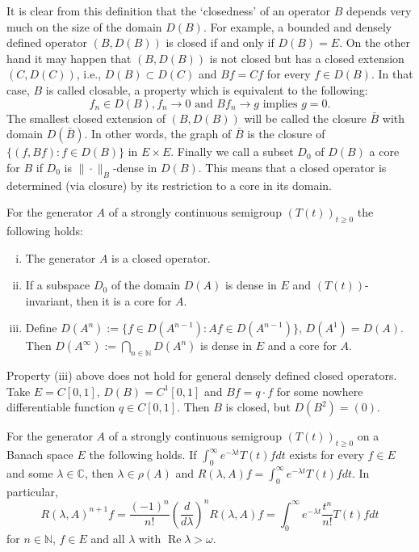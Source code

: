 It is clear from this definition that the \enquote*{closedness} of an operator $B$ depends very much on the size of the domain $D(B)$.
For example, a bounded and densely defined operator $(B,D(B))$ is closed if and only if $D(B) = E$.
On the other hand it may happen that $(B,D(B))$ is not closed but has a closed extension $(C,D(C))$, i.e., $D(B) \subset D(C)$ and $Bf = Cf$ for every $f \in D(B)$.
In that case, $B$ is called closable, a property which is equivalent to the following:
\begin{equation}
f_{n} \in D(B), f_{n} \to 0 \text{ and } Bf_{n} \to g \text{ implies } g = 0.
\end{equation}
The smallest closed extension of $(B,D(B))$ will be called the closure $\bar{B}$ with domain $D(\bar{B})$.
In other words, the graph of $\bar{B}$ is the closure of $\{(f,Bf) \colon f \in D(B)\}$ in $E \times E$.
Finally we call a subset $D_0$ of $D(B)$ a core for $B$ if $D_0$ is $\|\cdot\|_{B}$-dense in $D(B)$.
This means that a closed operator is determined (via closure) by its restriction to a core in its domain.
\begin{proposition}
For the generator $A$ of a strongly continuous semigroup $(T(t))_{t \geq 0}$ the following holds:

\begin{enumerate}[(i)]
\item
The generator $A$ is a closed operator.

\item
If a subspace $D_0$ of the domain $D(A)$ is dense in $E$ and $(T(t))$-invariant, then it is a core for $A$.
\item
Define $D(A^{n}) := \{f \in D(A^{n-1}) \colon Af \in D(A^{n-1})\}$, $D(A^{1}) = D(A)$.
Then $D(A^\infty) := \bigcap_{n \in \mathbb{N}} D(A^{n})$ is dense in $E$ and a core for $A$.

\end{enumerate}
\end{proposition}
\begin{example}
Property (iii) above does not hold for general densely defined closed operators.
Take $E = C[0,1]$, $D(B) = C^{1}[0,1]$ and $Bf = q \cdot f$ for some nowhere differentiable function $q \in C[0,1]$.
Then $B$ is closed, but $D(B^{2}) = (0)$.
\end{example}
\begin{proposition}
For the generator $A$ of a strongly continuous semigroup $(T(t))_{t \geq 0}$ on a Banach space $E$ the following holds.
If $\int_0^\infty e^{-\lambda t}T(t)f dt$ exists for every $f \in E$ and some $\lambda \in \mathbb{C}$, then $\lambda \in \rho(A)$ and $R(\lambda,A)f = \int_0^\infty e^{-\lambda t}T(t)f dt$.
In particular,
\begin{equation}
R(\lambda,A)^{n+1}f = \frac{(-1)^{n}}{n!}\left(\frac{d}{d\lambda}\right)^{n} R(\lambda,A)f = \int_0^\infty e^{-\lambda t}\frac{t^{n}}{n!}T(t)f dt
\end{equation}
for $n \in \mathbb{N}$, $f \in E$ and all $\lambda$ with $\operatorname{Re}\lambda > \omega$.
\end{proposition}
